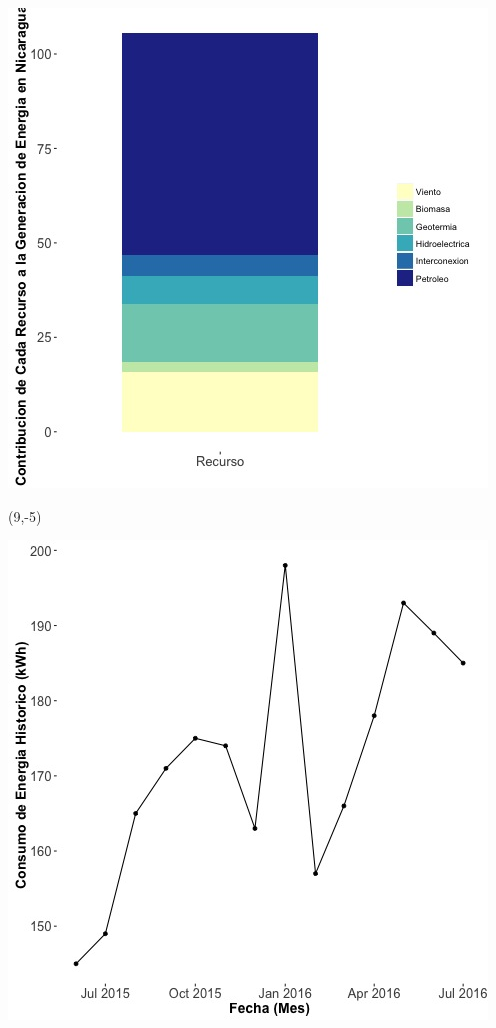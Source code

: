 \documentclass{article}\usepackage[]{graphicx}\usepackage[]{color}
\newenvironment{knitrout}{}{} %
\begin{document}
\begin{knitrout}
\color{fgcolor}
\includegraphics[scale=0.65]{figure/gridplot2.jpg} 
\end{knitrout}

 \begin{textblock}{1}(9,-5)
\begin{minipage}{20em}
\begingroup

\endgroup
\end{minipage}
\end{textblock}

\begin{knitrout}
\color{fgcolor}
\includegraphics[scale=0.65]{figure/A9_historico_energia} 
\end{knitrout}
\end{document}
